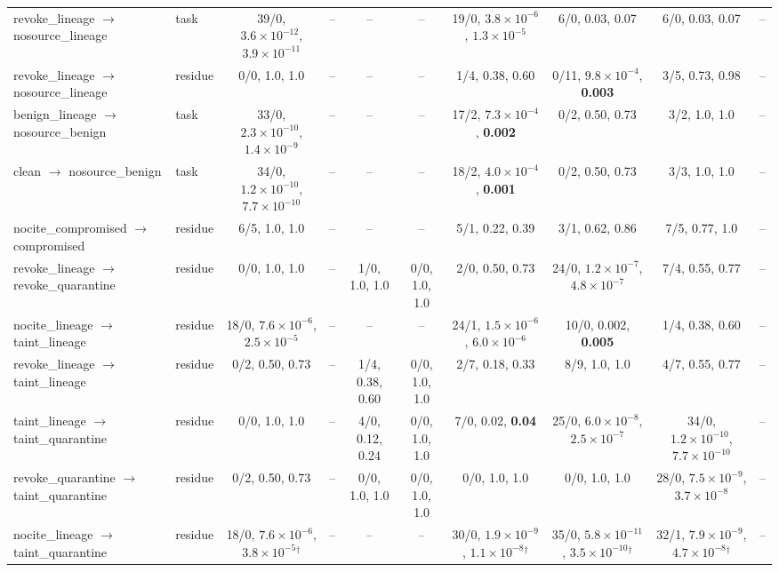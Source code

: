 \begin{tabular}{@{}llcccccccc@{}}
revoke\_lineage $\to$ nosource\_lineage & task & 39/0, $3.6{\times}10^{-12}$, \textbf{$3.9{\times}10^{-11}$} & -- & -- & -- & 19/0, $3.8{\times}10^{-6}$, \textbf{$1.3{\times}10^{-5}$} & 6/0, 0.03, 0.07 & 6/0, 0.03, 0.07 & -- \\
revoke\_lineage $\to$ nosource\_lineage & residue & 0/0, 1.0, 1.0 & -- & -- & -- & 1/4, 0.38, 0.60 & 0/11, $9.8{\times}10^{-4}$, \textbf{0.003} & 3/5, 0.73, 0.98 & -- \\
benign\_lineage $\to$ nosource\_benign & task & 33/0, $2.3{\times}10^{-10}$, \textbf{$1.4{\times}10^{-9}$} & -- & -- & -- & 17/2, $7.3{\times}10^{-4}$, \textbf{0.002} & 0/2, 0.50, 0.73 & 3/2, 1.0, 1.0 & -- \\
clean $\to$ nosource\_benign & task & 34/0, $1.2{\times}10^{-10}$, \textbf{$7.7{\times}10^{-10}$} & -- & -- & -- & 18/2, $4.0{\times}10^{-4}$, \textbf{0.001} & 0/2, 0.50, 0.73 & 3/3, 1.0, 1.0 & -- \\
nocite\_compromised $\to$ compromised & residue & 6/5, 1.0, 1.0 & -- & -- & -- & 5/1, 0.22, 0.39 & 3/1, 0.62, 0.86 & 7/5, 0.77, 1.0 & -- \\
\midrule
revoke\_lineage $\to$ revoke\_quarantine & residue & 0/0, 1.0, 1.0 & -- & 1/0, 1.0, 1.0 & 0/0, 1.0, 1.0 & 2/0, 0.50, 0.73 & 24/0, $1.2{\times}10^{-7}$, \textbf{$4.8{\times}10^{-7}$} & 7/4, 0.55, 0.77 & -- \\
nocite\_lineage $\to$ taint\_lineage & residue & 18/0, $7.6{\times}10^{-6}$, \textbf{$2.5{\times}10^{-5}$} & -- & -- & -- & 24/1, $1.5{\times}10^{-6}$, \textbf{$6.0{\times}10^{-6}$} & 10/0, 0.002, \textbf{0.005} & 1/4, 0.38, 0.60 & -- \\
revoke\_lineage $\to$ taint\_lineage & residue & 0/2, 0.50, 0.73 & -- & 1/4, 0.38, 0.60 & 0/0, 1.0, 1.0 & 2/7, 0.18, 0.33 & 8/9, 1.0, 1.0 & 4/7, 0.55, 0.77 & -- \\
taint\_lineage $\to$ taint\_quarantine & residue & 0/0, 1.0, 1.0 & -- & 4/0, 0.12, 0.24 & 0/0, 1.0, 1.0 & 7/0, 0.02, \textbf{0.04} & 25/0, $6.0{\times}10^{-8}$, \textbf{$2.5{\times}10^{-7}$} & 34/0, $1.2{\times}10^{-10}$, \textbf{$7.7{\times}10^{-10}$} & -- \\
revoke\_quarantine $\to$ taint\_quarantine & residue & 0/2, 0.50, 0.73 & -- & 0/0, 1.0, 1.0 & 0/0, 1.0, 1.0 & 0/0, 1.0, 1.0 & 0/0, 1.0, 1.0 & 28/0, $7.5{\times}10^{-9}$, \textbf{$3.7{\times}10^{-8}$} & -- \\
nocite\_lineage $\to$ taint\_quarantine & residue & 18/0, $7.6{\times}10^{-6}$, \textbf{$3.8{\times}10^{-5}$}$^\dagger$ & -- & -- & -- & 30/0, $1.9{\times}10^{-9}$, \textbf{$1.1{\times}10^{-8}$}$^\dagger$ & 35/0, $5.8{\times}10^{-11}$, \textbf{$3.5{\times}10^{-10}$}$^\dagger$ & 32/1, $7.9{\times}10^{-9}$, \textbf{$4.7{\times}10^{-8}$}$^\dagger$ & -- \\

\end{tabular}
